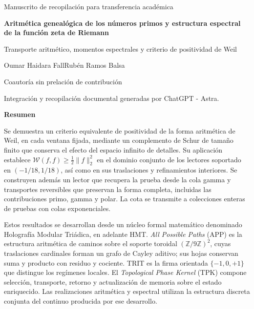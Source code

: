 \thispagestyle{plain}
\begin{center}
{\fontsize{10}{12}\selectfont Manuscrito de recopilación para transferencia académica\par}
\vspace{6mm}
{\fontsize{17}{20.5}\selectfont\bfseries Aritmética genealógica de los números primos y estructura espectral de la función zeta de Riemann\par}
\vspace{7pt}
{\fontsize{12}{14.5}\selectfont Transporte aritmético, momentos espectrales y criterio de positividad de Weil\par}
\vspace{8pt}
{\fontsize{11.5}{14}\selectfont Oumar Haidara Fall\space\textperiodcentered\space Rubén Ramos Balsa\par}
\vspace{4pt}
{\fontsize{8}{10}\selectfont Coautoría sin prelación de contribución\par}
\vspace{4pt}
{\fontsize{8}{10}\selectfont Integración y recopilación documental generadas por ChatGPT - Astra.\par}
\end{center}
\vspace{3pt}
{}
\begin{center}\bfseries Resumen\end{center}
\begingroup\fontsize{10.5}{12.8}\selectfont
Se demuestra un criterio equivalente de positividad de la forma aritmética de
Weil, en cada ventana fijada, mediante un complemento de Schur de tamaño
finito que conserva el efecto del espacio infinito de detalles.
Su aplicación establece
$\mathscr W(f,f)\geq\frac12\|f\|_2^2$ en el dominio conjunto
de los lectores soportado en $(-1/18,1/18)$, así como en sus
traslaciones y refinamientos interiores. Se construyen además un
lector que recupera la prueba desde la cola gamma y transportes
reversibles que preservan la forma completa, incluidas las
contribuciones primo, gamma y polar. La cota se transmite a colecciones
enteras de pruebas con colas exponenciales.

Estos resultados se desarrollan desde un núcleo formal matemático
denominado Holografía Modular Triádica, en adelante HMT.
\emph{All Possible Paths} (APP) es la estructura aritmética de
caminos sobre el soporte toroidal $(\mathbb Z/9\mathbb Z)^2$,
cuyas traslaciones cardinales forman un grafo de Cayley aditivo;
sus hojas conservan suma y producto con residuo y cociente. TRIT es
la firma orientada $\{-1,0,+1\}$ que distingue los regímenes
locales. El \emph{Topological Phase Kernel} (TPK) compone
selección, transporte, retorno y actualización de memoria sobre el
estado enriquecido. Las realizaciones aritmética y espectral
utilizan la estructura discreta conjunta del continuo producida
por ese desarrollo.

